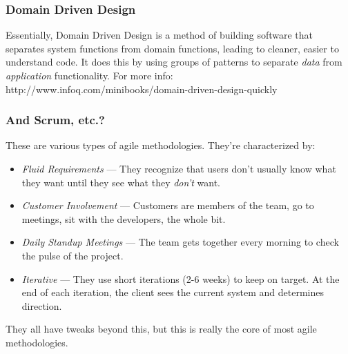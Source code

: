 \documentclass[t, 10pt]{beamer}
\begin{document}
\begin{frame}
\frametitle{Domain Driven Design}
Essentially, Domain Driven Design is a method of building software that separates system functions from domain functions, leading to cleaner, easier to understand code.
\newline
\newline
 It does this by using groups of patterns to separate \textit{data} from \textit{application} functionality.
\newline
\newline
For more info: http://www.infoq.com/minibooks/domain-driven-design-quickly
\end{frame}

\begin{frame}
\frametitle{And Scrum, etc.?}
These are various types of agile methodologies.  They're characterized by:
\begin{itemize}
\item \textit{Fluid Requirements} --- They recognize that users don't usually know what they want until they see what they \textit{don't} want.
\item \textit{Customer Involvement} --- Customers are members of the team, go to meetings, sit with the developers, the whole bit.
\item \textit{Daily Standup Meetings} --- The team gets together every morning to check the pulse of the project.
\item \textit{Iterative} --- They use short iterations (2-6 weeks) to keep on target.  At the end of each iteration, the client sees the current system and determines direction.
\end{itemize}
They all have tweaks beyond this, but this is really the core of most agile methodologies.
\end{frame}

\begin{frame}
\frametitle{}
\end{frame}
\end{document}
